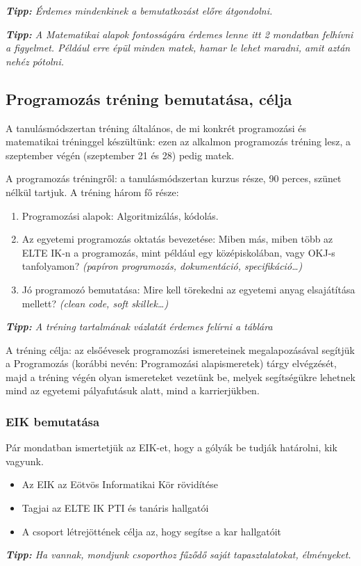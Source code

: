 \documentclass[../Main.tex]{subfiles}
\begin{document}
\textit{\textbf{Tipp:} Érdemes mindenkinek a bemutatkozást előre átgondolni.}

\textit{\textbf{Tipp:} A Matematikai alapok fontosságára érdemes lenne itt 2 mondatban 
felhívni a figyelmet. Például erre épül minden matek, hamar le lehet maradni, amit aztán nehéz pótolni.}

\subsection{Programozás tréning bemutatása, célja}

A tanulásmódszertan tréning általános, de mi konkrét programozási és matematikai tréninggel készültünk:
ezen az alkalmon programozás tréning lesz, a szeptember végén (szeptember 21 és 28) pedig matek.

A programozás tréningről: a tanulásmódszertan kurzus része, 90 perces, szünet nélkül tartjuk.
A tréning három fő része:
\begin{enumerate}
    \item Programozási alapok: Algoritmizálás, kódolás.
    \item Az egyetemi programozás oktatás bevezetése: Miben más, miben több az ELTE IK-n a programozás,
    mint például egy középiskolában, vagy OKJ-s tanfolyamon? 
    \textit{(papíron programozás, dokumentáció, specifikáció…)}
    \item Jó programozó bemutatása: Mire kell törekedni az egyetemi anyag elsajátítása mellett?
    \textit{(clean code, soft skillek…)}
\end{enumerate}

\textit{\textbf{Tipp:} A tréning tartalmának vázlatát érdemes felírni a táblára}

A tréning célja: az elsőévesek programozási ismereteinek megalapozásával segítjük a Programozás
(korábbi nevén: Programozási alapismeretek) tárgy elvégzését, majd a tréning végén olyan ismereteket
vezetünk be, melyek segítségükre lehetnek mind az egyetemi pályafutásuk alatt, mind a karrierjükben.

\subsubsection{EIK bemutatása}
Pár mondatban ismertetjük az EIK-et, hogy a gólyák be tudják határolni, kik vagyunk.

\begin{itemize}
    \item Az EIK az Eötvös Informatikai Kör rövidítése
    \item Tagjai az ELTE IK PTI és tanáris hallgatói
    \item A csoport létrejöttének célja az, hogy segítse a kar hallgatóit
\end{itemize}
\textit{\textbf{Tipp: } Ha vannak, mondjunk csoporthoz fűződő saját tapasztalatokat, élményeket.}
\end{document}
